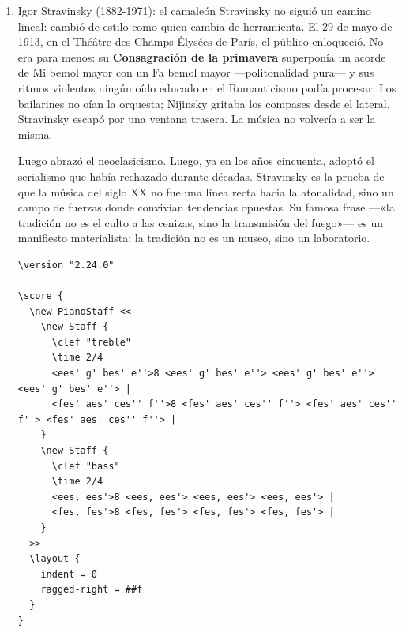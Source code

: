 \documentclass[14pt, a4paper]{article}
\begin{document}
\begin{enumerate}
\begin{verbatim}
(
// Rutina: tocar la serie en sus formas original, inversa y retrógrada
~serie_schoenberg = Routine({
    // Serie original P0: Do, Do#, Re, Re#, Mi, Fa, Fa#, Sol, Sol#, La, La#, Si
    var p0 = [60, 61, 62, 63, 64, 65, 66, 67, 68, 69, 70, 71];
    // Inversa: espejo alrededor de la primera nota
    var inversa = p0.collect { |n| 60 - (n - 60) };
    // Retrógrada: la serie al revés
    var retrograda = p0.reverse;

    ("=== Schoenberg: serie dodecafónica ===").postln;
    ("Serie original P0").postln;
    p0.do { |n| Synth(\serie, [\freq, n.midicps, \amp, 0.08]); 0.3.wait };
    1.wait;

    ("Serie inversa").postln;
    inversa.do { |n| Synth(\serie, [\freq, n.midicps, \amp, 0.06]); 0.3.wait };
    1.wait;

    ("Serie retrógrada").postln;
    retrograda.do { |n| Synth(\serie, [\freq, n.midicps, \amp, 0.06]); 0.3.wait };
    1.wait;

    ("Las doce notas sin jerarquía. Ninguna subordinada a otra.").postln;
});

~serie_schoenberg.play;
)
\end{verbatim}
\item Igor Stravinsky (1882-1971): el camaleón
\label{stravinsky}
Stravinsky no siguió un camino lineal: cambió de estilo como quien
cambia de herramienta. El 29 de mayo de 1913, en el Théâtre des
Champs-Élysées de París, el público enloqueció. No era para menos: su
\textbf{Consagración de la primavera} superponía un acorde de Mi bemol mayor
con un Fa bemol mayor —politonalidad pura— y sus ritmos violentos
ningún oído educado en el Romanticismo podía procesar. Los bailarines
no oían la orquesta; Nijinsky gritaba los compases desde el lateral.
Stravinsky escapó por una ventana trasera. La música no volvería a ser
la misma.

Luego abrazó el neoclasicismo. Luego, ya en los años cincuenta, adoptó
el serialismo que había rechazado durante décadas. Stravinsky es la
prueba de que la música del siglo XX no fue una línea recta hacia la
atonalidad, sino un campo de fuerzas donde convivían tendencias
opuestas. Su famosa frase —«la tradición no es el culto a las
cenizas, sino la transmisión del fuego»— es un manifiesto
materialista: la tradición no es un museo, sino un laboratorio.

\begin{verbatim}
\version "2.24.0"

\score {
  \new PianoStaff <<
    \new Staff {
      \clef "treble"
      \time 2/4
      <ees' g' bes' e''>8 <ees' g' bes' e''> <ees' g' bes' e''> <ees' g' bes' e''> |
      <fes' aes' ces'' f''>8 <fes' aes' ces'' f''> <fes' aes' ces'' f''> <fes' aes' ces'' f''> |
    }
    \new Staff {
      \clef "bass"
      \time 2/4
      <ees, ees'>8 <ees, ees'> <ees, ees'> <ees, ees'> |
      <fes, fes'>8 <fes, fes'> <fes, fes'> <fes, fes'> |
    }
  >>
  \layout {
    indent = 0
    ragged-right = ##f
  }
}
\end{verbatim}


\end{enumerate}
\end{document}
